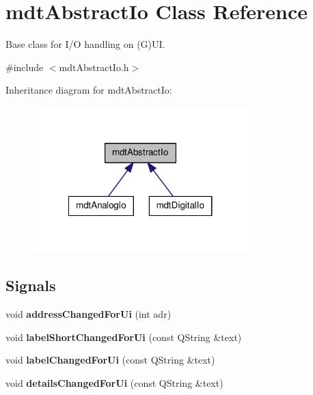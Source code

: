 \hypertarget{classmdt_abstract_io}{
\section{mdtAbstractIo Class Reference}
\label{classmdt_abstract_io}
}


Base class for I/O handling on (G)UI.  




{\ttfamily \#include $<$mdtAbstractIo.h$>$}



Inheritance diagram for mdtAbstractIo:\nopagebreak
\begin{figure}[H]
\begin{center}
\leavevmode
\includegraphics[width=236pt]{classmdt_abstract_io__inherit__graph}
\end{center}
\end{figure}
\subsection*{Signals}
\begin{DoxyCompactItemize}
\item 
\hypertarget{classmdt_abstract_io_a217c4fa4f4996a97f939d4066c88fffc}{
void {\bfseries addressChangedForUi} (int adr)}
\label{classmdt_abstract_io_a217c4fa4f4996a97f939d4066c88fffc}

\item 
\hypertarget{classmdt_abstract_io_aa12930a4316d7679668a07855c92e625}{
void {\bfseries labelShortChangedForUi} (const QString \&text)}
\label{classmdt_abstract_io_aa12930a4316d7679668a07855c92e625}

\item 
\hypertarget{classmdt_abstract_io_ab87859883a00193ac680c09cfef8dc84}{
void {\bfseries labelChangedForUi} (const QString \&text)}
\label{classmdt_abstract_io_ab87859883a00193ac680c09cfef8dc84}

\item 
\hypertarget{classmdt_abstract_io_aa6add53c265560420b70852ba490c2ff}{
void {\bfseries detailsChangedForUi} (const QString \&text)}
\label{classmdt_abstract_io_aa6add53c265560420b70852ba490c2ff}

\end{DoxyCompactItemize}
